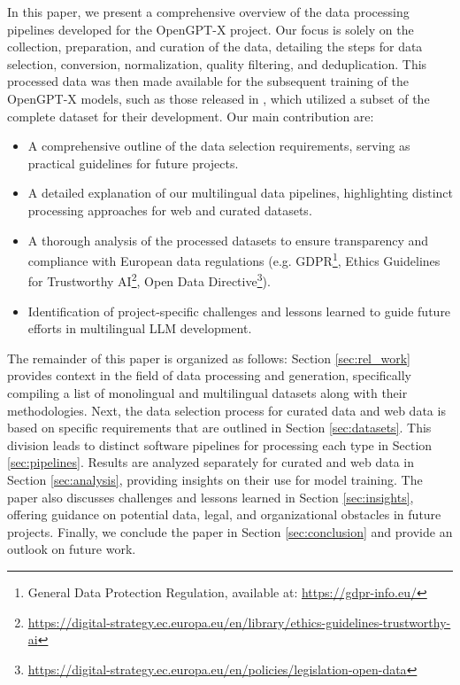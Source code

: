 In this paper, we present a comprehensive overview of the data processing pipelines developed 
for the OpenGPT-X project. Our focus is solely on the collection, preparation, and curation 
of the data, detailing the steps for data selection, conversion, normalization, quality 
filtering, and deduplication. This processed data was then made available for the subsequent 
training of the OpenGPT-X models, such as those released in \cite{opengpt_x_2024_13866365}, which utilized a subset of the complete dataset for their development.
Our main contribution are:
\begin{itemize}

    \item A comprehensive outline of the data selection requirements, serving as practical guidelines for future projects.

    \item A detailed explanation of our multilingual data pipelines, highlighting distinct processing approaches for web and curated datasets.
    
    \item A thorough analysis of the processed datasets to ensure transparency and compliance with European data regulations (e.g. GDPR\footnote{General Data Protection Regulation, available at: \url{https://gdpr-info.eu/}}, Ethics Guidelines for Trustworthy AI\footnote{\url{https://digital-strategy.ec.europa.eu/en/library/ethics-guidelines-trustworthy-ai}}, Open Data Directive\footnote{\url{https://digital-strategy.ec.europa.eu/en/policies/legislation-open-data}}).
    
    \item Identification of project-specific challenges and lessons learned to guide future efforts in multilingual LLM development.
    
\end{itemize}

The remainder of this paper is organized as follows:  
Section \ref{sec:rel_work} provides context in the field of data processing and 
generation, specifically compiling a list of monolingual and multilingual datasets 
along with their methodologies.  
Next, the data selection process for curated data and web data is based on 
specific requirements that are outlined in Section \ref{sec:datasets}. This division leads to distinct software pipelines 
for processing each type in Section \ref{sec:pipelines}.
Results are analyzed separately for curated and web data in Section \ref{sec:analysis}, 
providing insights on their use for model training.
The paper also discusses challenges and lessons learned in Section \ref{sec:insights}, 
offering guidance on potential data, legal, and organizational obstacles in future projects.
Finally, we conclude the paper in Section \ref{sec:conclusion} and provide an outlook on future work.
